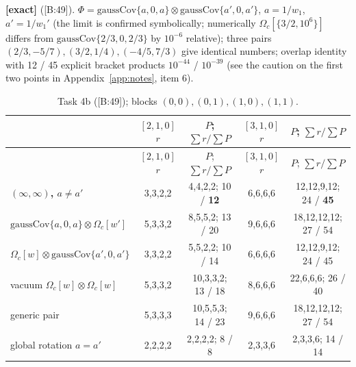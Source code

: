 \documentclass[10pt]{article}
\newcommand{\cl}[2]{\textsf{[#1:#2]}}
\newcommand{\tg}[1]{\textbf{[#1]}}
\newcommand{\Om}{\Omega}
\begin{document}
\tg{exact} (\cl{B}{49}). $\Phi=\mathrm{gaussCov}\{a,0,a\}\otimes\mathrm{gaussCov}\{a',0,a'\}$, $a=1/w_1$, $a'=1/w_1'$ (the limit is confirmed symbolically; numerically $\Om_c[\{3/2,10^6\}]$ differs from $\mathrm{gaussCov}\{2/3,0,2/3\}$ by $10^{-6}$ relative); three pairs $(2/3,-5/7),(3/2,1/4),(-4/5,7/3)$ give identical numbers; overlap identity with 12 / 45 explicit bracket products $10^{-44}$ / $10^{-39}$ (see the caution on the first two points in Appendix~\ref{app:notes}, item 6).
\begin{center}\small\setlength{\tabcolsep}{4pt}\begin{longtable}{@{}p{4.6cm}cccc@{}}
\caption{Task 4b (\cl{B}{49}); blocks $(0,0),(0,1),(1,0),(1,1)$.}\label{tab:B4b}\\\toprule
 & $[2,1,0]$ $r$ & $P$; $\sum r/\sum P$ & $[3,1,0]$ $r$ & $P$; $\sum r/\sum P$ \\\midrule\endfirsthead
 & $[2,1,0]$ $r$ & $P$; $\sum r/\sum P$ & $[3,1,0]$ $r$ & $P$; $\sum r/\sum P$ \\\midrule\endhead
\textbf{$(\infty,\infty)$, $a\neq a'$} & 3,3,2,2 & 4,4,2,2; 10 / \textbf{12} & 6,6,6,6 & 12,12,9,12; 24 / \textbf{45} \\
$\mathrm{gaussCov}\{a,0,a\}\otimes\Om_c[w']$ & 5,3,3,2 & 8,5,5,2; 13 / 20 & 9,6,6,6 & 18,12,12,12; 27 / 54 \\
$\Om_c[w]\otimes\mathrm{gaussCov}\{a',0,a'\}$ & 3,3,2,2 & 5,5,2,2; 10 / 14 & 6,6,6,6 & 12,12,9,12; 24 / 45 \\
vacuum $\Om_c[w]\otimes\Om_c[w]$ & 5,3,3,2 & 10,3,3,2; 13 / 18 & 8,6,6,6 & 22,6,6,6; 26 / 40 \\
generic pair & 5,3,3,3 & 10,5,5,3; 14 / 23 & 9,6,6,6 & 18,12,12,12; 27 / 54 \\
global rotation $a=a'$ & 2,2,2,2 & 2,2,2,2; 8 / 8 & 2,3,3,6 & 2,3,3,6; 14 / 14 \\
\bottomrule
\end{longtable}\end{center}
\end{document}

